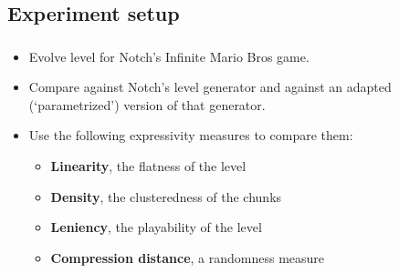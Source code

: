 \documentclass{beamer}
\makeatletter
\newcommand*{\currentname}{\@currentlabelname}
\makeatother
\begin{document}
\subsection{Experiment setup}
\begin{frame}
\frametitle{\currentname}
\begin{itemize}
\item Evolve level for Notch's Infinite Mario Bros game.
\item Compare against Notch's level generator and against an adapted (`parametrized') version of that generator.
\item Use the following expressivity measures to compare them:
\begin{itemize}
\item \textbf{Linearity}, the flatness of the level
\item \textbf{Density}, the clusteredness of the chunks
\item \textbf{Leniency}, the playability of the level
\item \textbf{Compression distance}, a randomness measure
\end{itemize}
\end{itemize}
\end{frame}
\end{document}
